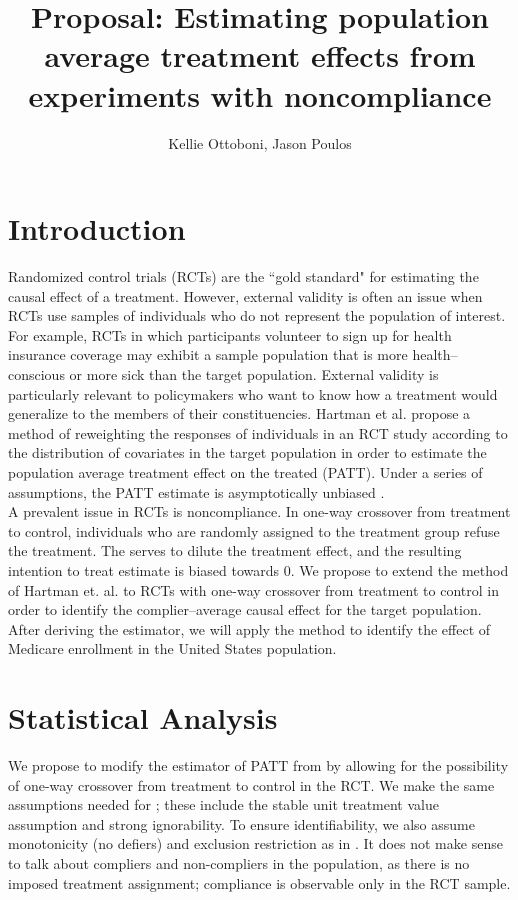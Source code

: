 \documentclass{article}
\title{Proposal: Estimating population average treatment effects from experiments with noncompliance}
\author{Kellie Ottoboni, Jason Poulos}
\begin{document}
\maketitle

\section{Introduction}
Randomized control trials (RCTs) are the ``gold standard" for estimating the causal effect of a treatment.  However, external validity is often an issue when RCTs use samples of individuals who do not represent the population of interest.  For example, RCTs in which participants volunteer to sign up for health insurance coverage may exhibit a sample population that is more health--conscious or more sick than the target population.  External validity is particularly relevant to policymakers who want to know how a treatment would generalize to the members of their constituencies. Hartman et al. propose a method of reweighting the responses of individuals in an RCT study according to the distribution of covariates in the target population in order to estimate the population average treatment effect on the treated (PATT).  Under a series of assumptions, the PATT estimate is asymptotically unbiased \cite{Hartman}. \\

A prevalent issue in RCTs is noncompliance.  In one-way crossover from treatment to control, individuals who are randomly assigned to the treatment group refuse the treatment.  The serves to dilute the treatment effect, and the resulting intention to treat estimate is biased towards $0$.  We propose to extend the method of Hartman et. al. to RCTs with one-way crossover from treatment to control in order to identify the complier--average causal effect for the target population.  After deriving the estimator, we will apply the method to identify the effect of Medicare enrollment in the United States population.

\section{Statistical Analysis}
We propose to modify the estimator of PATT from \cite{Hartman} by allowing for the possibility of one-way crossover from treatment to control in the RCT.  We make the same assumptions needed for \cite{Hartman}; these include the stable unit treatment value assumption and strong ignorability.  To ensure identifiability, we also assume monotonicity (no defiers) and exclusion restriction as in \cite{Angrist1996}.  It does not make sense to talk about compliers and non-compliers in the population, as there is no imposed treatment assignment; compliance is observable only in the RCT sample.   \\
\end{document}
